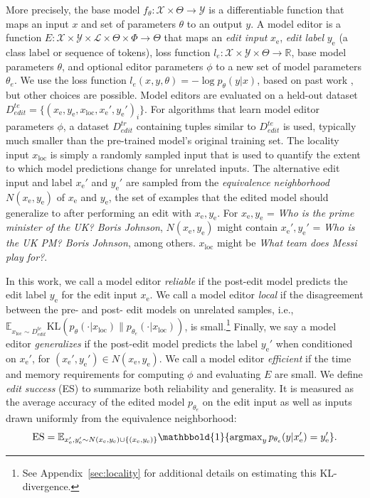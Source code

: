 \documentclass{article}
\DeclareMathOperator*{\argmax}{\arg\!\max}
\newcommand{\baseparams}{\theta}
\newcommand{\editedparams}{\theta_e}
\newcommand{\xe}{x_\text{e}}
\newcommand{\xloc}{x_\text{loc}}
\newcommand{\ye}{y_\text{e}}
\newcommand{\dtrain}{D^{tr}_{edit}}
\newcommand{\dtest}{D^{te}_{edit}}
\newcommand{\basemodel}{f_\baseparams}
\newcommand{\neighborhood}{N(\xe,\ye)}
\newcommand{\rebuttal}[1]{#1}
\begin{document}
More precisely, the base model $\basemodel:\mathcal{X} \times \Theta \rightarrow \mathcal{Y}$ is a differentiable function that maps an input $x$ and set of parameters $\baseparams$ to an output $y$. A model editor is a function $E : \mathcal{X} \times \mathcal{Y} \times \mathcal{L} \times \Theta \times \Phi \rightarrow \Theta$ that maps an \textit{edit input} $\xe$, \textit{edit label} $\ye$ \rebuttal{(a class label or sequence of tokens)}, loss function $l_e:\mathcal{X} \times \mathcal{Y} \times \Theta \rightarrow \mathbb{R}$, base model parameters $\baseparams$, and optional editor parameters $\phi$ to a new set of model parameters $\editedparams$. We use the loss function $l_e(x,y,\baseparams) = - \log p_\baseparams(y|x)$, based on past work \citep{Cao2021EditingFK}, but other choices are possible. Model editors are evaluated on a held-out dataset $\dtest = \{(\xe,\ye,\xloc,\xe',\ye')_i\}$. For algorithms that learn model editor parameters $\phi$, a dataset $\dtrain$ containing tuples similar to $\dtest$ is used, typically much smaller than the pre-trained model's original training set. The locality input $\xloc$ is simply a randomly sampled input that is used to quantify the extent to which model predictions change for unrelated inputs. The alternative edit input and label $\xe'$ and $\ye'$ are sampled from the \textit{equivalence neighborhood} $\neighborhood$ of $\xe$ and $\ye$, the set of examples that the edited model should generalize to after performing an edit with $\xe,\ye$. For $\xe,\ye$ = \textit{Who is the prime minister of the UK? Boris Johnson}, $\neighborhood$ might contain $\xe',\ye'$ = \textit{Who is the UK PM? Boris Johnson}, among others. $\xloc$ might be \textit{What team does Messi play for?}.

In this work, we call a model editor \emph{reliable} if the post-edit model predicts the edit label $\ye$ for the edit input $\xe$. We call a model editor \emph{local} if the disagreement between the pre- and post- edit models on unrelated samples, i.e., $\mathbb{E}_{\xloc\sim\dtest}\text{KL}(p_\baseparams(\cdot | \xloc) \| p_{\editedparams}(\cdot | \xloc))$, is small.\footnote{See Appendix~\ref{sec:locality} for additional details on estimating this KL-divergence.} Finally, we say a model editor \emph{generalizes} if the post-edit model predicts the label $\ye'$ when conditioned on $\xe'$, for $(\xe',\ye')\in\neighborhood$. We call a model editor \emph{efficient} if the time and memory requirements for computing $\phi$ and evaluating $E$ are small. We define \textit{edit success} (ES) to summarize both reliability and generality. It is measured as the average accuracy of the edited model $p_{\editedparams}$ on the edit input as well as inputs drawn uniformly from the equivalence neighborhood:
\begin{equation}
    \text{ES} = \mathbb{E}_{\xe',\ye' \sim \neighborhood \cup \{(\xe,\ye)\}}\mathbbold{1}\{\argmax\nolimits_yp_{\editedparams}(y|\xe') = \ye'\}.
    \label{eq:edit-success}
\end{equation}
\vspace{-4mm}
\end{document}
